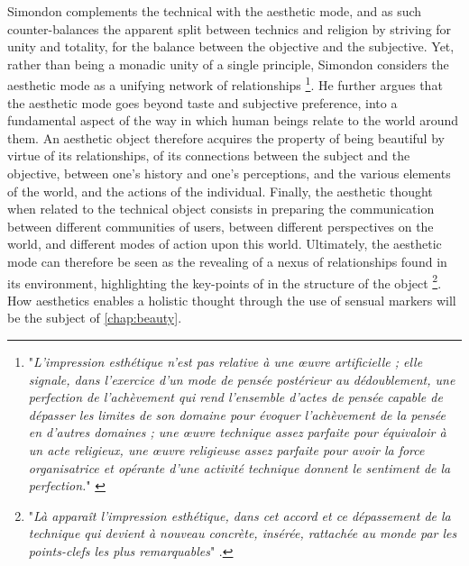 Simondon complements the technical with the aesthetic mode, and as such counter-balances the apparent split between technics and religion by striving for unity and totality, for the balance between the objective and the subjective. Yet, rather than being a monadic unity of a single principle, Simondon considers the aesthetic mode as a unifying network of relationships \footnote{"\emph{L'impression esthétique n'est pas relative à une œuvre artificielle ; elle signale, dans l'exercice d'un mode de pensée postérieur au dédoublement, une perfection de l'achèvement qui rend l'ensemble d'actes de pensée capable de dépasser les limites de son domaine pour évoquer l'achèvement de la pensée en d'autres domaines ; une œuvre technique assez parfaite pour équivaloir à un acte religieux, une œuvre religieuse assez parfaite pour avoir la force organisatrice et opérante d'une activité technique donnent le sentiment de la perfection.}" \citep{simondon_mode_1958}}. He further argues that the aesthetic mode goes beyond taste and subjective preference, into a fundamental aspect of the way in which human beings relate to the world around them. An aesthetic object therefore acquires the property of being beautiful by virtue of its relationships, of its connections between the subject and the objective, between one's history and one's perceptions, and the various elements of the world, and the actions of the individual. Finally, the aesthetic thought when related to the technical object consists in preparing the communication between different communities of users, between different perspectives on the world, and different modes of action upon this world. Ultimately, the aesthetic mode can therefore be seen as the revealing of a nexus of relationships found in its environment, highlighting the key-points of in the structure of the object \footnote{"\emph{Là apparaît l'impression esthétique, dans cet accord et ce dépassement de la technique qui devient à nouveau concrète, insérée, rattachée au monde par les points-clefs les plus remarquables}" \citep{simondon_mode_1958}.}. How aesthetics enables a holistic thought through the use of sensual markers will be the subject of \autoref{chap:beauty}.

